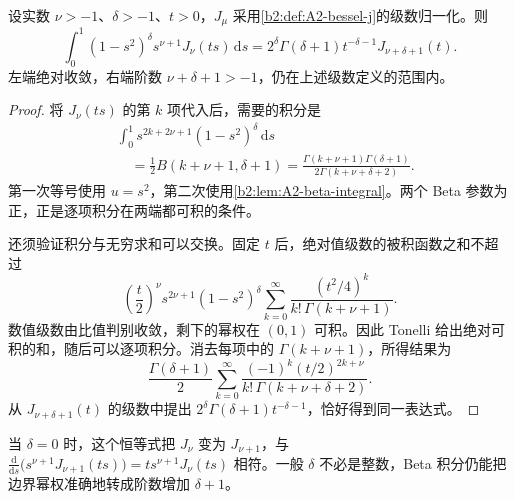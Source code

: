 \begin{lemma}\label{b2:lem:A2-power-integral}
设实数 \(\nu>-1\)、\(\delta>-1\)、\(t>0\)，\(J_\mu\) 采用\cref{b2:def:A2-bessel-j}的级数归一化。则
\[
 \int_0^1(1-s^2)^\delta s^{\nu+1}J_\nu(ts)\,\mathrm ds
 =2^\delta\Gamma(\delta+1)t^{-\delta-1}
       J_{\nu+\delta+1}(t).
\]
左端绝对收敛，右端阶数 \(\nu+\delta+1>-1\)，仍在上述级数定义的范围内。
\end{lemma}
\begin{proof}
将 \(J_\nu(ts)\) 的第 \(k\) 项代入后，需要的积分是
\[
 \begin{aligned}
 &\int_0^1s^{2k+2\nu+1}(1-s^2)^\delta\,\mathrm ds\\
 &\hspace{1em}=\frac12B(k+\nu+1,\delta+1)
 =\frac{\Gamma(k+\nu+1)\Gamma(\delta+1)}
        {2\Gamma(k+\nu+\delta+2)}.
 \end{aligned}
\]
第一次等号使用 \(u=s^2\)，第二次使用\cref{b2:lem:A2-beta-integral}。两个 Beta 参数为正，正是逐项积分在两端都可积的条件。

还须验证积分与无穷求和可以交换。固定 \(t\) 后，绝对值级数的被积函数之和不超过
\[
 \left(\frac t2\right)^\nu
 s^{2\nu+1}(1-s^2)^\delta
 \sum_{k=0}^\infty
       \frac{(t^2/4)^k}{k!\,\Gamma(k+\nu+1)}.
\]
数值级数由比值判别收敛，剩下的幂权在 \((0,1)\) 可积。因此 Tonelli 给出绝对可积的和，随后可以逐项积分。消去每项中的 \(\Gamma(k+\nu+1)\)，所得结果为
\[
 \frac{\Gamma(\delta+1)}2
 \sum_{k=0}^\infty
 \frac{(-1)^k(t/2)^{2k+\nu}}
      {k!\,\Gamma(k+\nu+\delta+2)}.
\]
从 \(J_{\nu+\delta+1}(t)\) 的级数中提出
\(2^\delta\Gamma(\delta+1)t^{-\delta-1}\)，恰好得到同一表达式。
\end{proof}

当 \(\delta=0\) 时，这个恒等式把 \(J_\nu\) 变为 \(J_{\nu+1}\)，与
\(\frac{\mathrm d}{\mathrm ds}\bigl(s^{\nu+1}J_{\nu+1}(ts)\bigr)
=t s^{\nu+1}J_\nu(ts)\) 相符。一般 \(\delta\) 不必是整数，Beta 积分仍能把边界幂权准确地转成阶数增加 \(\delta+1\)。

